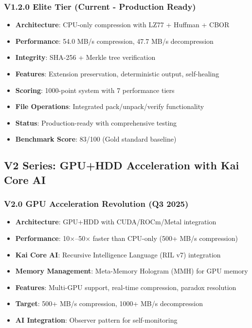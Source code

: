 \documentclass[12pt,a4paper]{article}
\begin{document}
\subsubsection{V1.2.0 Elite Tier (Current - Production Ready)}
\begin{itemize}
    \item \textbf{Architecture}: CPU-only compression with LZ77 + Huffman + CBOR
    \item \textbf{Performance}: 54.0 MB/s compression, 47.7 MB/s decompression
    \item \textbf{Integrity}: SHA-256 + Merkle tree verification
    \item \textbf{Features}: Extension preservation, deterministic output, self-healing
    \item \textbf{Scoring}: 1000-point system with 7 performance tiers
    \item \textbf{File Operations}: Integrated pack/unpack/verify functionality
    \item \textbf{Status}: Production-ready with comprehensive testing
    \item \textbf{Benchmark Score}: 83/100 (Gold standard baseline)
\end{itemize}

\subsection{V2 Series: GPU+HDD Acceleration with Kai Core AI}
\subsubsection{V2.0 GPU Acceleration Revolution (Q3 2025)}
\begin{itemize}
    \item \textbf{Architecture}: GPU+HDD with CUDA/ROCm/Metal integration
    \item \textbf{Performance}: 10×–50× faster than CPU-only (500+ MB/s compression)
    \item \textbf{Kai Core AI}: Recursive Intelligence Language (RIL v7) integration
    \item \textbf{Memory Management}: Meta-Memory Hologram (MMH) for GPU memory
    \item \textbf{Features}: Multi-GPU support, real-time compression, paradox resolution
    \item \textbf{Target}: 500+ MB/s compression, 1000+ MB/s decompression
    \item \textbf{AI Integration}: Observer pattern for self-monitoring
\end{itemize}
\end{document}
